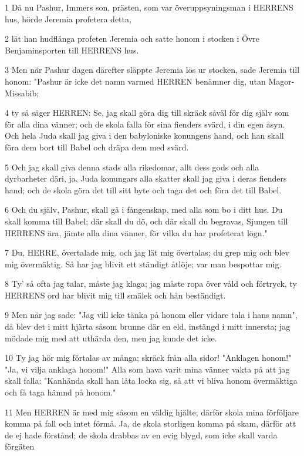 \par 1 Då nu Pashur, Immers son, prästen, som var överuppsyningsman i HERRENS hus, hörde Jeremia profetera detta,
\par 2 lät han hudflänga profeten Jeremia och satte honom i stocken i Övre Benjaminsporten till HERRENS hus.
\par 3 Men när Pashur dagen därefter släppte Jeremia lös ur stocken, sade Jeremia till honom: "Pashur är icke det namn varmed HERREN benämner dig, utan Magor-Missabib;
\par 4 ty så säger HERREN: Se, jag skall göra dig till skräck såväl för dig själv som för alla dina vänner; och de skola falla för sina fienders svärd, i din egen åsyn. Och hela Juda skall jag giva i den babyloniske konungens hand, och han skall föra dem bort till Babel och dräpa dem med svärd.
\par 5 Och jag skall giva denna stads alla rikedomar, allt dess gods och alla dyrbarheter däri, ja, Juda konungars alla skatter skall jag giva i deras fienders hand; och de skola göra det till sitt byte och taga det och föra det till Babel.
\par 6 Och du själv, Pashur, skall gå i fångenskap, med alla som bo i ditt hus. Du skall komma till Babel; där skall du dö, och där skall du begravas, Sjungen till HERRENS ära, jämte alla dina vänner, för vilka du har profeterat lögn."
\par 7 Du, HERRE, övertalade mig, och jag lät mig övertalas; du grep mig och blev mig övermäktig. Så har jag blivit ett ständigt åtlöje; var man bespottar mig.
\par 8 Ty' så ofta jag talar, måste jag klaga; jag måste ropa över våld och förtryck, ty HERRENS ord har blivit mig till smälek och hån beständigt.
\par 9 Men när jag sade: "Jag vill icke tänka på honom eller vidare tala i hans namn", då blev det i mitt hjärta såsom brunne där en eld, instängd i mitt innersta; jag mödade mig med att uthärda den, men jag kunde det icke.
\par 10 Ty jag hör mig förtalas av många; skräck från alla sidor! "Anklagen honom!" "Ja, vi vilja anklaga honom!" Alla som hava varit mina vänner vakta på att jag skall falla: "Kanhända skall han låta locka sig, så att vi bliva honom övermäktiga och få taga hämnd på honom."
\par 11 Men HERREN är med mig såsom en väldig hjälte; därför skola mina förföljare komma på fall och intet förmå. Ja, de skola storligen komma på skam, därför att de ej hade förstånd; de skola drabbas av en evig blygd, som icke skall varda förgäten
